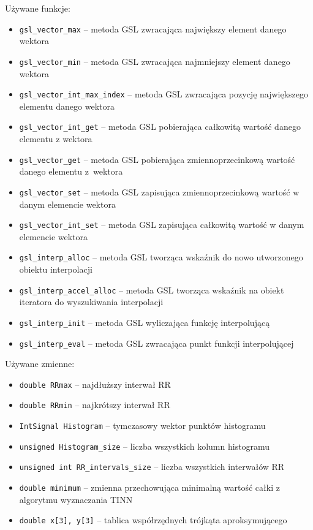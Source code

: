 \documentclass[a4paper, 11pt]{article}
\begin{document}
Używane funkcje:
\begin{itemize}
\item \verb+gsl_vector_max+ -- metoda GSL zwracająca największy element danego
wektora
\item \verb+gsl_vector_min+ -- metoda GSL zwracająca najmniejszy element danego
wektora
\item \verb+gsl_vector_int_max_index+ -- metoda GSL zwracająca pozycję największego
elementu danego wektora
\item \verb+gsl_vector_int_get+ -- metoda GSL pobierająca całkowitą wartość danego
elementu z wektora
\item \verb+gsl_vector_get+ -- metoda GSL pobierająca zmiennoprzecinkową wartość
danego elementu z~wektora
\item \verb+gsl_vector_set+ -- metoda GSL zapisująca zmiennoprzecinkową wartość
w danym elemencie wektora
\item \verb+gsl_vector_int_set+ -- metoda GSL zapisująca całkowitą wartość w
danym elemencie wektora
\item \verb+gsl_interp_alloc+ -- metoda GSL tworząca wskaźnik do nowo utworzonego
obiektu interpolacji
\item \verb+gsl_interp_accel_alloc+ -- metoda GSL tworząca wskaźnik na obiekt
iteratora do wyszukiwania interpolacji 
\item \verb+gsl_interp_init+ -- metoda GSL wyliczająca funkcję interpolującą
\item \verb+gsl_interp_eval+ -- metoda GSL zwracająca punkt funkcji interpolującej 
\end{itemize}
\medskip{}


Używane zmienne:
\begin{itemize}
\item \verb+double RRmax+ -- najdłuższy interwał RR
\item \verb+double RRmin+ -- najkrótszy interwał RR
\item \verb+IntSignal Histogram+ -- tymczasowy wektor punktów histogramu
\item \verb+unsigned Histogram_size+ -- liczba wszystkich kolumn histogramu
\item \verb+unsigned int RR_intervals_size+ -- liczba wszystkich interwałów RR
\item \verb+double minimum+ -- zmienna przechowująca minimalną wartość całki z algorytmu
wyznaczania TINN
\item \verb+double x[3], y[3]+ -- tablica współrzędnych trójkąta aproksymującego
\end{itemize}
\end{document}
